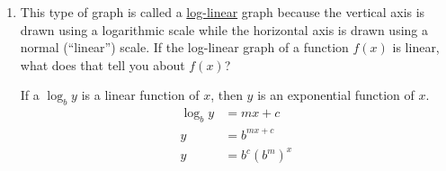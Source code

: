 \documentclass{article}
\begin{document}
\begin{enumerate}
\begin{enumerate}[resume]
    \begin{solution}
      We can see that $\log_{10} C$ is roughly a linear function of $t$,
      $\log_{10} C \approx -0.4t+3.9$.
    \end{solution}

    \begin{problem}[\vfill]
      Use your formula for $\log_{10} C(t)$ to get an approximate formula for $C(t)$, and sketch a ``normal'' graph of $C(t)$. 
    \end{problem}

    \begin{solution}
      We can solve $\log_{10} C \approx -0.4t + 3.9$ for $C$:
      \begin{align*}
        \log_{10} C &\approx -0.4t + 3.9 \\
        C &\approx 10^{-0.4t + 3.9} \\
        C &\approx 10^{3.9} (10^{-0.4})^t \\
        C &\approx 8000(0.4)^t
      \end{align*}
      Therefore $C(t) \approx 8000(0.4)^t$. A ``normal'' graph would
      look like this.
      \begin{center}
      \end{center}
      
    \end{solution}

  \item
    \begin{problem}[\nstretch{0.4}]
      This type of graph is called a \uline{log-linear} graph because the vertical axis is drawn using a logarithmic scale while the horizontal axis is drawn using a normal (``linear'') scale. If the log-linear graph of a function $f(x)$ is linear, what does that tell you about $f(x)$?
    \end{problem}

    \begin{solution}
      If a $\log_{b} y$ is a linear function of $x$, then $y$ is
      an exponential function of $x$.
      \begin{align*}
          \log_{b} y &= mx+c \\
          y &= b^{mx+c} \\
          y &= b^c (b^m)^x
      \end{align*}
    \end{solution}


\end{enumerate}
\end{enumerate}
\end{document}
